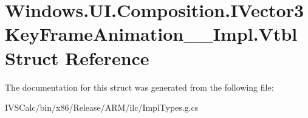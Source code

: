 \hypertarget{struct_windows_1_1_u_i_1_1_composition_1_1_i_vector3_key_frame_animation_____impl_1_1_vtbl}{}\section{Windows.\+U\+I.\+Composition.\+I\+Vector3\+Key\+Frame\+Animation\+\_\+\+\_\+\+Impl.\+Vtbl Struct Reference}
\label{struct_windows_1_1_u_i_1_1_composition_1_1_i_vector3_key_frame_animation_____impl_1_1_vtbl}


The documentation for this struct was generated from the following file\+:\begin{DoxyCompactItemize}
\item 
I\+V\+S\+Calc/bin/x86/\+Release/\+A\+R\+M/ilc/Impl\+Types.\+g.\+cs\end{DoxyCompactItemize}
